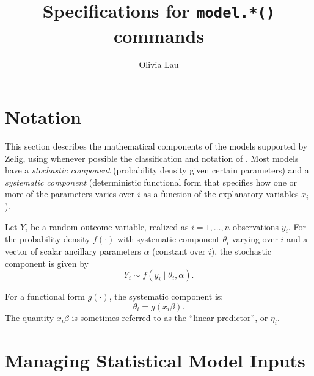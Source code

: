 \documentclass[oneside,letterpaper,12pt]{article}
\title{Specifications for {\tt model.*()} commands}
\author{Olivia Lau}
\begin{document}
\maketitle

\section{Notation}  

This section describes the mathematical components of the models
supported by Zelig, using whenever possible the classification and
notation of \cite{King89}.  Most models have a \emph{stochastic
component} (probability density given certain parameters) and a
\emph{systematic component} (deterministic functional form that
specifies how one or more of the parameters varies over $i$ as a
function of the explanatory variables $x_i$).

Let $Y_i$ be a random outcome variable, realized as $i = 1, \dots,n$
observations $y_i$.  For the probability density $f(\cdot)$ with
systematic component $\theta_i$ varying over $i$ and a vector of scalar ancillary
parameters $\alpha$ (constant over $i$), the stochastic component is
given by
\begin{equation*}
Y_i \sim f(y_i \mid \theta_i, \alpha).
\end{equation*}

For a functional form $g(\cdot)$, the systematic component is:  
\begin{equation*}
\theta_i = g(x_i \beta).
\end{equation*}
The quantity $x_i \beta$ is sometimes referred to as the ``linear
predictor'', or $\eta_i$.  

\section{Managing Statistical Model Inputs}
\end{document}
